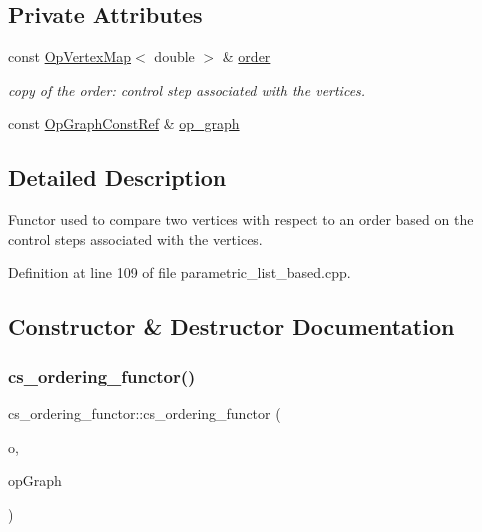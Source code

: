 \subsection*{Private Attributes}
\begin{DoxyCompactItemize}
\item 
const \hyperlink{classOpVertexMap}{Op\+Vertex\+Map}$<$ double $>$ \& \hyperlink{structcs__ordering__functor_ac71c00993ded0112622e5fe35adec653}{order}
\begin{DoxyCompactList}\small\item\em copy of the order\+: control step associated with the vertices. \end{DoxyCompactList}\item 
const \hyperlink{op__graph_8hpp_a9a0b240622c47584bee6951a6f5de746}{Op\+Graph\+Const\+Ref} \& \hyperlink{structcs__ordering__functor_a658ddd6a7cb202fa156621e964450aa2}{op\+\_\+graph}
\end{DoxyCompactItemize}


\subsection{Detailed Description}
Functor used to compare two vertices with respect to an order based on the control steps associated with the vertices. 

Definition at line 109 of file parametric\+\_\+list\+\_\+based.\+cpp.



\subsection{Constructor \& Destructor Documentation}
\mbox{\label{structcs__ordering__functor_a013a079f45948b182ae82cb82e84d379}} 
\subsubsection{\texorpdfstring{cs\+\_\+ordering\+\_\+functor()}{cs\_ordering\_functor()}}
{\footnotesize\ttfamily cs\+\_\+ordering\+\_\+functor\+::cs\+\_\+ordering\+\_\+functor (\begin{DoxyParamCaption}\item[{const \hyperlink{classOpVertexMap}{Op\+Vertex\+Map}$<$ double $>$ \&}]{o,  }\item[{const \hyperlink{op__graph_8hpp_a9a0b240622c47584bee6951a6f5de746}{Op\+Graph\+Const\+Ref} \&}]{op\+Graph }\end{DoxyParamCaption})\hspace{0.3cm}{\ttfamily [inline]}}



